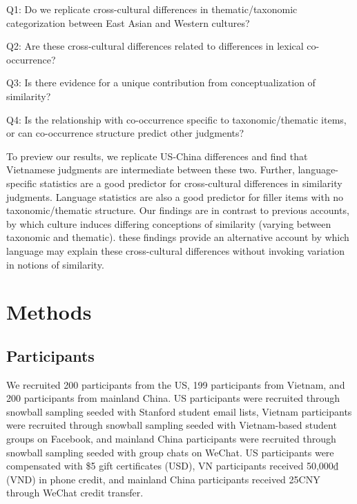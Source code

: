 \documentclass[10pt, letterpaper]{article}
\begin{document}
Q1: Do we replicate cross-cultural differences in thematic/taxonomic
categorization between East Asian and Western cultures?

Q2: Are these cross-cultural differences related to differences in
lexical co-occurrence?

Q3: Is there evidence for a unique contribution from conceptualization
of similarity?

Q4: Is the relationship with co-occurrence specific to
taxonomic/thematic items, or can co-occurrence structure predict other
judgments?~

To preview our results, we replicate US-China differences and find that
Vietnamese judgments are intermediate between these two. Further,
language-specific statistics are a good predictor for cross-cultural
differences in similarity judgments. Language statistics are also a good
predictor for filler items with no taxonomic/thematic structure. Our
findings are in contrast to previous accounts, by which culture induces
differing conceptions of similarity (varying between taxonomic and
thematic). these findings provide an alternative account by which
language may explain these cross-cultural differences without invoking
variation in notions of similarity.

\hypertarget{methods}{%
\section{Methods}\label{methods}}

\hypertarget{participants}{%
\subsection{Participants}\label{participants}}

We recruited 200 participants from the US, 199 participants from
Vietnam, and 200 participants from mainland China. US participants were
recruited through snowball sampling seeded with Stanford student email
lists, Vietnam participants were recruited through snowball sampling
seeded with Vietnam-based student groups on Facebook, and mainland China
participants were recruited through snowball sampling seeded with group
chats on WeChat. US participants were compensated with \$5 gift
certificates (USD), VN participants received 50,000₫ (VND) in phone
credit, and mainland China participants received 25CNY through WeChat
credit transfer.
\end{document}
